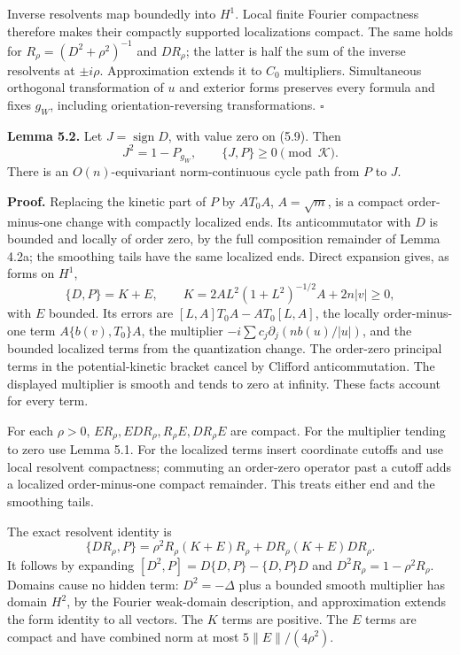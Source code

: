\documentclass[
  11pt,
]{article}
\begin{document}
Inverse resolvents map boundedly into \(H^1\). Local finite Fourier
compactness therefore makes their compactly supported localizations
compact. The same holds for \(R_\rho=(D^2+\rho^2)^{-1}\) and
\(DR_\rho\); the latter is half the sum of the inverse resolvents at
\(\pm i\rho\). Approximation extends it to \(C_0\) multipliers.
Simultaneous orthogonal transformation of \(u\) and exterior forms
preserves every formula and fixes \(g_W\), including
orientation-reversing transformations. \(\square\)

\textbf{Lemma 5.2.} Let \(J=\operatorname{sign}D\), with value zero on
(5.9). Then \[
J^2=1-P_{g_W},\qquad\{J,P\}\geq0\pmod{\mathcal K}.
\tag{5.12}
\] There is an \(O(n)\)-equivariant norm-continuous cycle path from
\(P\) to \(J\).

\textbf{Proof.} Replacing the kinetic part of \(P\) by \(A T_0 A\),
\(A=\sqrt m\), is a compact order-minus-one change with compactly
localized ends. Its anticommutator with \(D\) is bounded and locally of
order zero, by the full composition remainder of Lemma 4.2a; the
smoothing tails have the same localized ends. Direct expansion gives, as
forms on \(H^1\), \[
\{D,P\}=K+E,\qquad
K=2A L^2(1+L^2)^{-1/2}A+2n|v|\geq0,
\tag{5.13}
\] with \(E\) bounded. Its errors are \([L,A]T_0A-AT_0[L,A]\), the
locally order-minus-one term \(A\{b(v),T_0\}A\), the multiplier
\(-i\sum c_j\partial_j(n b(u)/|u|)\), and the bounded localized terms
from the quantization change. The order-zero principal terms in the
potential-kinetic bracket cancel by Clifford anticommutation. The
displayed multiplier is smooth and tends to zero at infinity. These
facts account for every term.

For each \(\rho>0\), \(ER_\rho,EDR_\rho,R_\rho E,DR_\rho E\) are
compact. For the multiplier tending to zero use Lemma 5.1. For the
localized terms insert coordinate cutoffs and use local resolvent
compactness; commuting an order-zero operator past a cutoff adds a
localized order-minus-one compact remainder. This treats either end and
the smoothing tails.

The exact resolvent identity is \[
\{DR_\rho,P\}=\rho^2R_\rho(K+E)R_\rho+
DR_\rho(K+E)DR_\rho.
\tag{5.14}
\] It follows by expanding \([D^2,P]=D\{D,P\}-\{D,P\}D\) and
\(D^2R_\rho=1-\rho^2R_\rho\). Domains cause no hidden term:
\(D^2=-\Delta\) plus a bounded smooth multiplier has domain \(H^2\), by
the Fourier weak-domain description, and approximation extends the form
identity to all vectors. The \(K\) terms are positive. The \(E\) terms
are compact and have combined norm at most \(5\|E\|/(4\rho^2)\).
\end{document}
